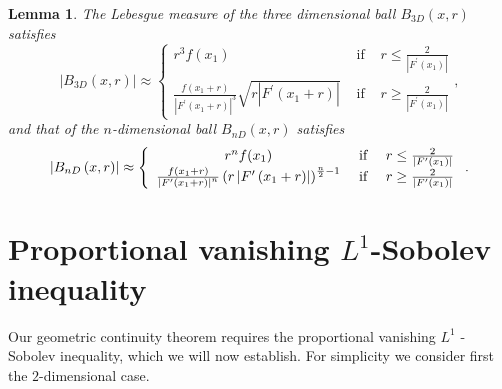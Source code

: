 \documentclass{amsart}
\theoremstyle{plain}
\newtheorem{lemma}[theorem]{Lemma}
\numberwithin{equation}{section}
\begin{document}
\begin{lemma}
	\label{new}The Lebesgue measure of the \emph{three} dimensional ball $%
	B_{3D}\left( x,r\right) $ satisfies%
	\begin{equation*}
	\left\vert B_{3D}\left( x,r\right) \right\vert \approx \left\{ 
	\begin{array}{ccc}
	r^{3}f(x_{1}) & \text{ if } & r\leq \frac{2}{\left\vert F^{\prime }\left(
		x_{1}\right) \right\vert } \\ 
	\frac{f\left( x_{1}+r\right) }{\left\vert F^{\prime }\left( x_{1}+r\right)
		\right\vert ^{3}}\sqrt{r\left\vert F^{\prime }\left( x_{1}+r\right)
		\right\vert } & \text{ if } & r\geq \frac{2}{\left\vert F^{\prime }\left(
		x_{1}\right) \right\vert }%
	\end{array}%
	\right. ,
	\end{equation*}%
	and that of the $n$-dimensional ball $B_{nD}\left( x,r\right) $ satisfies%
	\begin{equation*}
	\left\vert B_{nD}\left( x,r\right) \right\vert \approx \left\{ 
	\begin{array}{ccc}
	r^{n}f(x_{1}) & \text{ if } & r\leq \frac{2}{\left\vert F^{\prime }\left(
		x_{1}\right) \right\vert } \\ 
	\frac{f\left( x_{1}+r\right) }{\left\vert F^{\prime }\left( x_{1}+r\right)
		\right\vert ^{n}}\left( r\left\vert F^{\prime }\left( x_{1}+r\right)
	\right\vert \right) ^{\frac{n}{2}-1} & \text{ if } & r\geq \frac{2}{%
		\left\vert F^{\prime }\left( x_{1}\right) \right\vert }%
	\end{array}%
	\right. .
	\end{equation*}
\end{lemma}

\section{Proportional vanishing $L^{1}$-Sobolev inequality}

Our geometric continuity theorem requires the proportional vanishing $L^{1}$%
-Sobolev inequality, which we will now establish. For simplicity we consider first the $2$-dimensional case.
\end{document}
